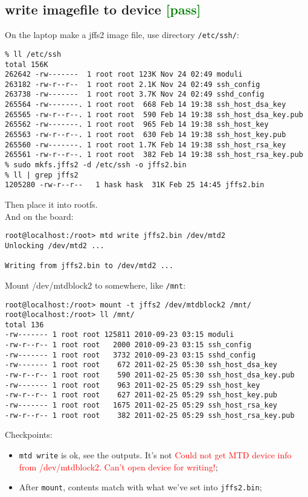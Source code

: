 \documentclass[a4paper]{report}
\begin{document}
\subsection{write imagefile to device \textcolor{green}{[pass]}}
On the laptop make a jffs2 image file, use directory {\tt /etc/ssh/}:
\begin{lstlisting}
% ll /etc/ssh
total 156K
262642 -rw-------  1 root root 123K Nov 24 02:49 moduli
263182 -rw-r--r--  1 root root 2.1K Nov 24 02:49 ssh_config
263738 -rw-------  1 root root 3.7K Nov 24 02:49 sshd_config
265564 -rw-------. 1 root root  668 Feb 14 19:38 ssh_host_dsa_key
265565 -rw-r--r--. 1 root root  590 Feb 14 19:38 ssh_host_dsa_key.pub
265562 -rw-------. 1 root root  965 Feb 14 19:38 ssh_host_key
265563 -rw-r--r--. 1 root root  630 Feb 14 19:38 ssh_host_key.pub
265560 -rw-------. 1 root root 1.7K Feb 14 19:38 ssh_host_rsa_key
265561 -rw-r--r--. 1 root root  382 Feb 14 19:38 ssh_host_rsa_key.pub
% sudo mkfs.jffs2 -d /etc/ssh -o jffs2.bin  
% ll | grep jffs2 
1205280 -rw-r--r--   1 hask hask  31K Feb 25 14:45 jffs2.bin
\end{lstlisting}
Then place it into rootfs.\\
And on the board:
\begin{lstlisting}
root@localhost:/root> mtd write jffs2.bin /dev/mtd2
Unlocking /dev/mtd2 ...

Writing from jffs2.bin to /dev/mtd2 ...     
\end{lstlisting}
Mount {/dev/mtdblock2} to somewhere, like {\tt /mnt}:
\begin{lstlisting}
root@localhost:/root> mount -t jffs2 /dev/mtdblock2 /mnt/
root@localhost:/root> ll /mnt/
total 136
-rw------- 1 root root 125811 2010-09-23 03:15 moduli
-rw-r--r-- 1 root root   2000 2010-09-23 03:15 ssh_config
-rw------- 1 root root   3732 2010-09-23 03:15 sshd_config
-rw------- 1 root root    672 2011-02-25 05:30 ssh_host_dsa_key
-rw-r--r-- 1 root root    590 2011-02-25 05:30 ssh_host_dsa_key.pub
-rw------- 1 root root    963 2011-02-25 05:29 ssh_host_key
-rw-r--r-- 1 root root    627 2011-02-25 05:29 ssh_host_key.pub
-rw------- 1 root root   1675 2011-02-25 05:29 ssh_host_rsa_key
-rw-r--r-- 1 root root    382 2011-02-25 05:29 ssh_host_rsa_key.pub
\end{lstlisting}
Checkpoints:
\begin{itemize}
    \item {\tt mtd write} is ok, see the outputs. It's not \textcolor{red}
          {Could not get MTD device info from /dev/mtdblock2. 
           Can't open device for writing!};
    \item After {\tt mount}, contents match with what we've set into {\tt jffs2.bin};
\end{itemize}
\end{document}
